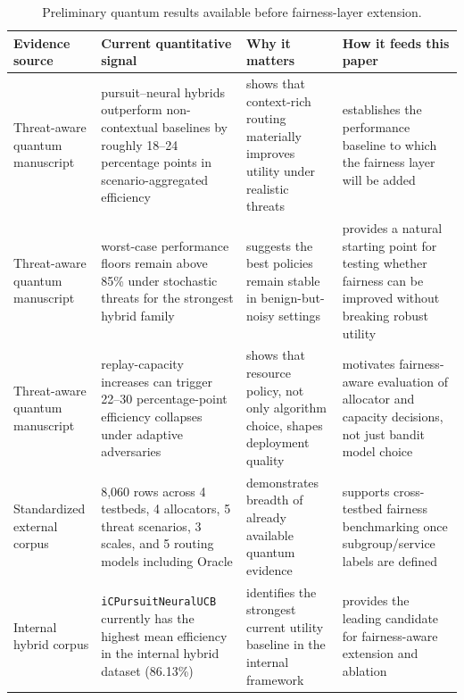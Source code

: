 \documentclass[conference]{IEEEtran}
\begin{document}
\begin{table}[t]
\caption{Preliminary quantum results available before fairness-layer extension.}
\label{tab:prelim_results}
\centering
\small
\begin{tabular}{p{}p{}p{}p{}}
\toprule
\textbf{Evidence source} & \textbf{Current quantitative signal} & \textbf{Why it matters} & \textbf{How it feeds this paper} \\
\midrule
Threat-aware quantum manuscript & pursuit--neural hybrids outperform non-contextual baselines by roughly 18--24 percentage points in scenario-aggregated efficiency & shows that context-rich routing materially improves utility under realistic threats & establishes the performance baseline to which the fairness layer will be added \\
Threat-aware quantum manuscript & worst-case performance floors remain above 85\% under stochastic threats for the strongest hybrid family & suggests the best policies remain stable in benign-but-noisy settings & provides a natural starting point for testing whether fairness can be improved without breaking robust utility \\
Threat-aware quantum manuscript & replay-capacity increases can trigger 22--30 percentage-point efficiency collapses under adaptive adversaries & shows that resource policy, not only algorithm choice, shapes deployment quality & motivates fairness-aware evaluation of allocator and capacity decisions, not just bandit model choice \\
Standardized external corpus & 8,060 rows across 4 testbeds, 4 allocators, 5 threat scenarios, 3 scales, and 5 routing models including Oracle & demonstrates breadth of already available quantum evidence & supports cross-testbed fairness benchmarking once subgroup/service labels are defined \\
Internal hybrid corpus & \texttt{iCPursuitNeuralUCB} currently has the highest mean efficiency in the internal hybrid dataset (86.13\%) & identifies the strongest current utility baseline in the internal framework & provides the leading candidate for fairness-aware extension and ablation \\
\bottomrule
\end{tabular}
\end{table}
\end{document}
